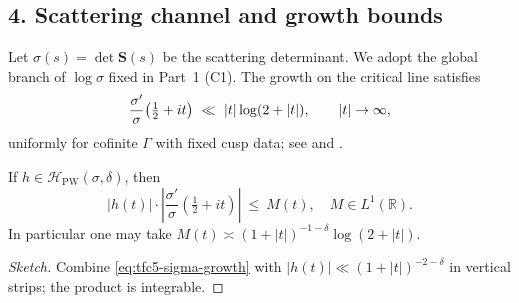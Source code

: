 \subsection*{4. Scattering channel and growth bounds}\relax\hspace{0pt}
\label{subsec:tfc5-scatt} %

Let $\sigma(s)=\det\mathbf{S}(s)$ be the scattering determinant. \relax\hspace{0pt}
We adopt the global branch of $\log\sigma$ fixed in Part~1 (C1). \relax\hspace{0pt}
The growth on the critical line satisfies
\begin{equation}\relax\hspace{0pt}
\label{eq:tfc5-sigma-growth}\relax\hspace{0pt}
\frac{\sigma'}{\sigma}\!\left(\tfrac12+it\right)\ \ll\ |t|\log(2+|t|),\qquad |t|\to\infty,
\end{equation}
uniformly for cofinite $\Gamma$ with fixed cusp data; see \cite[\S~6]{IwaniecSpectral} and \cite{HejhalII,Borthwick}. \relax\hspace{0pt}

\begin{lemma}\relax\hspace{0pt}
\label{lem:tfc5-L1}\relax\hspace{0pt}
If $h\in\mathcal{H}_{\mathrm{PW}}(\sigma,\delta)$, then
\[
|h(t)|\cdot\left|\frac{\sigma'}{\sigma}\!\left(\tfrac12+it\right)\right|\ \le\ M(t),\quad M\in L^1(\mathbb{R}).
\]
In particular one may take $M(t)\asymp (1+|t|)^{-1-\delta}\log(2+|t|)$.\relax\hspace{0pt}
\end{lemma}

\begin{proof}[Sketch]\relax\hspace{0pt}
Combine \eqref{eq:tfc5-sigma-growth} with $|h(t)|\ll (1+|t|)^{-2-\delta}$ in vertical strips; the product is integrable. \relax\hspace{0pt}
\end{proof}

